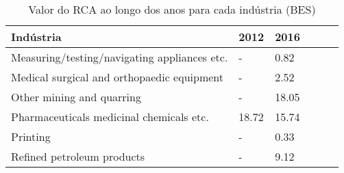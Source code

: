 \begin{table}
\centering
\caption{Valor do RCA ao longo dos anos para cada indústria (BES)}
\begin{tabular}{p{6cm}p{1.5cm}p{1.5cm}p{1.5cm}p{1.5cm}p{1.5cm}}
\toprule
                                   Indústria &  2012 &  2016 \\
\midrule
Measuring/testing/navigating appliances etc. &     - &  0.82 \\
  Medical surgical and orthopaedic equipment &     - &  2.52 \\
                   Other mining and quarring &     - & 18.05 \\
    Pharmaceuticals medicinal chemicals etc. & 18.72 & 15.74 \\
                                    Printing &     - &  0.33 \\
                  Refined petroleum products &     - &  9.12 \\
\bottomrule
\end{tabular}
\end{table}
